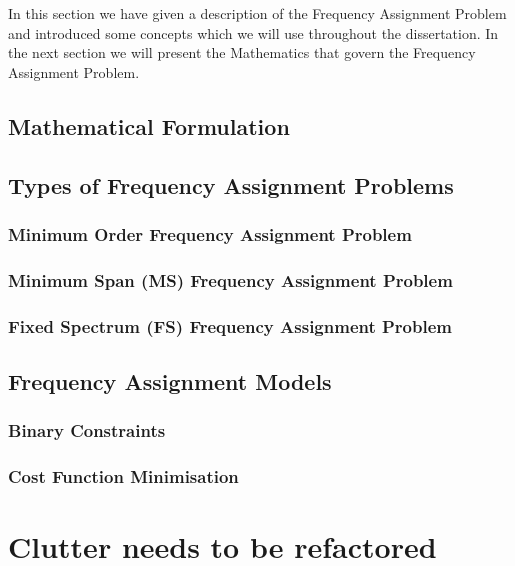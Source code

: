 In this section we have given a description of the Frequency Assignment Problem and introduced some concepts which we will use throughout the dissertation. In the next section we will present the 
Mathematics that govern the Frequency Assignment Problem.
\subsection{Mathematical Formulation}
\subsection{Types of Frequency Assignment Problems}
\subsubsection{Minimum Order Frequency Assignment Problem}
\subsubsection{Minimum Span (MS) Frequency Assignment Problem}
\subsubsection{Fixed Spectrum (FS) Frequency Assignment Problem}
\subsection{Frequency Assignment Models}
\subsubsection{Binary Constraints}
\subsubsection{Cost Function Minimisation}
\section{Clutter needs to be refactored}

